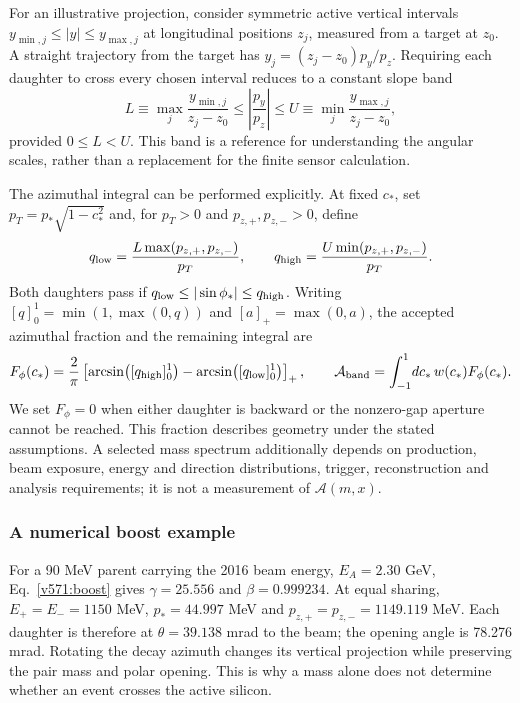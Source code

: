 For an illustrative projection, consider symmetric active
vertical intervals $y_{\min,j}\leq |y|\leq y_{\max,j}$ at longitudinal
positions $z_j$, measured from a target at $z_0$.  A straight trajectory from
the target has $y_j=(z_j-z_0)p_y/p_z$.  Requiring each daughter to cross every
chosen interval reduces to a constant slope band
\begin{equation}
  L\equiv\max_j\frac{y_{\min,j}}{z_j-z_0}
    \leq\left|\frac{p_y}{p_z}\right|\leq
  U\equiv\min_j\frac{y_{\max,j}}{z_j-z_0},
  \label{v571:projected-band}
\end{equation}
provided $0\leq L<U$.  This band is a reference for understanding the angular
scales, rather than a replacement for the finite sensor calculation.

The azimuthal integral can be performed explicitly.  At fixed $c_*$, set
$p_T=p_*\sqrt{1-c_*^2}$ and, for $p_T>0$ and $p_{z,+},p_{z,-}>0$, define
\begin{equation}
  q_{\rm low}=\frac{L\max(p_{z,+},p_{z,-})}{p_T},\qquad
  q_{\rm high}=\frac{U\min(p_{z,+},p_{z,-})}{p_T}.
  \label{v571:azimuth-bounds}
\end{equation}
Both daughters pass if $q_{\rm low}\leq |\sin\phi_*|\leq q_{\rm high}$.
Writing $[q]_0^1=\min(1,\max(0,q))$ and $[a]_+=\max(0,a)$, the accepted
azimuthal fraction and the remaining integral are
\begin{equation}
  F_\phi(c_*)=\frac2\pi
    \left[\arcsin\bigl([q_{\rm high}]_0^1\bigr)-
          \arcsin\bigl([q_{\rm low}]_0^1\bigr)\right]_+,\qquad
  \mathcal A_{\rm band}=\int_{-1}^{1}\!dc_*\,w(c_*)F_\phi(c_*).
  \label{v571:azimuth-fraction}
\end{equation}
We set $F_\phi=0$ when either daughter is backward or the nonzero-gap aperture
cannot be reached.  This fraction describes geometry under the stated
assumptions.  A selected mass spectrum additionally depends on production,
beam exposure, energy and direction distributions, trigger, reconstruction
and analysis requirements; it is not a measurement of $\mathcal A(m,x)$.

\subsubsection{A numerical boost example}
For a 90 MeV parent carrying the 2016 beam energy, $E_A=2.30$ GeV,
Eq.~\eqref{v571:boost} gives $\gamma=25.556$ and $\beta=0.999234$.
At equal sharing, $E_+=E_-=1150$ MeV, $p_*=44.997$ MeV and
$p_{z,+}=p_{z,-}=1149.119$ MeV. Each daughter is therefore at
$\theta=39.138$ mrad to the beam; the opening angle is 78.276 mrad.
Rotating the decay azimuth changes its vertical projection while preserving
the pair mass and polar opening. This is why a mass alone does not determine
whether an event crosses the active silicon.

